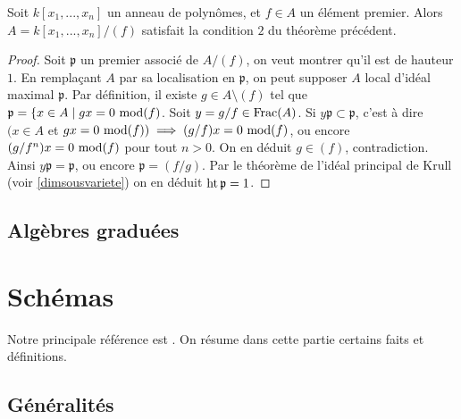 \begin{prop}\label{SerreCritere2}
Soit $k[x_1,...,x_n]$ un anneau de polynômes, et $f\in A$ un élément premier. Alors $A=k[x_1,...,x_n]/(f)$ satisfait la condition $2$ du théorème précédent. 
\end{prop}
\begin{proof}
Soit $\mathfrak{p}$ un premier associé de $A/(f)$, on veut montrer qu'il est de hauteur $1$. En remplaçant $A$ par sa localisation en $\mathfrak{p}$, on peut supposer $A$ local d'idéal maximal $\mathfrak{p}$. Par définition, il existe $g\in A\setminus (f) $ tel que $\mathfrak{p}=\lbrace x\in A\mid gx=0 \,\operatorname{mod} (f)$. Soit $y=g/f\in \operatorname{Frac}(A)$. Si $y\mathfrak{p}\subset\mathfrak{p}$, c'est à dire $(x\in A$ et $gx=0 \,\operatorname{mod} (f))\implies (g/f)x=0\,\operatorname{mod} (f)$, ou encore $(g/f^n)x=0\,\operatorname{mod} (f)$ pour tout $n>0$. On en déduit $g\in (f)$, contradiction. Ainsi $y\mathfrak{p}=\mathfrak{p}$, ou encore $\mathfrak{p}=(f/g)$. Par le théorème de l'idéal principal de Krull (voir \ref{dimsousvariete}) on en déduit $\operatorname{ht} \mathfrak{p}=1$.
\end{proof}

\subsection{Algèbres graduées}



\section{Schémas}

Notre principale référence est \cite{Hartshorne}. On résume dans cette partie certains faits et définitions. 

\subsection{Généralités}

